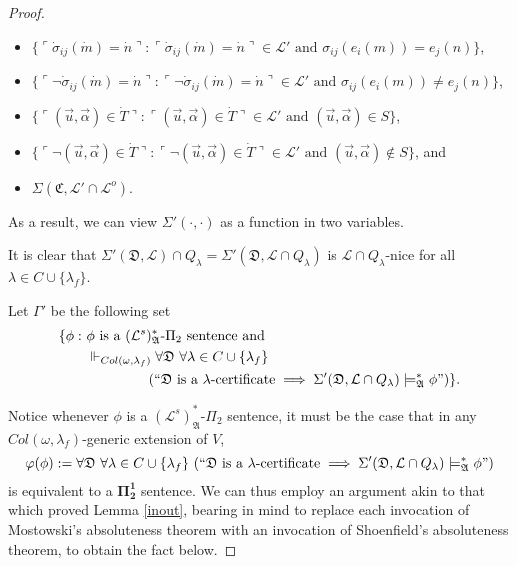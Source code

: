 \documentclass[12pt]{article}
\numberwithin{equation}{section}
\begin{document}
\begin{proof}
\begin{defi}
\begin{itemize}
    \item $\{\ulcorner \dot{\sigma}_{ij}(\dot{m}) = \dot{n} \urcorner : \ulcorner \dot{\sigma}_{ij}(\dot{m}) = \dot{n} \urcorner \in \mathcal{L}' \text{ and } \sigma_{ij}(e_i(m)) = e_j(n)\}$,
    \item $\{\ulcorner \neg \dot{\sigma}_{ij}(\dot{m}) = \dot{n} \urcorner : \ulcorner \neg \dot{\sigma}_{ij}(\dot{m}) = \dot{n} \urcorner \in \mathcal{L}' \text{ and } \sigma_{ij}(e_i(m)) \neq e_j(n)\}$,
    \item $\{\ulcorner (\Vec{u}, \Vec{\alpha}) \in \dot{T} \urcorner : \ulcorner (\Vec{u}, \Vec{\alpha}) \in \dot{T} \urcorner \in \mathcal{L}' \text{ and } (\Vec{u}, \Vec{\alpha}) \in S\}$,
    \item $\{\ulcorner \neg (\Vec{u}, \Vec{\alpha}) \in \dot{T} \urcorner : \ulcorner \neg (\Vec{u}, \Vec{\alpha}) \in \dot{T} \urcorner \in \mathcal{L}' \text{ and } (\Vec{u}, \Vec{\alpha}) \not\in S\}$, and
    \item $\Sigma(\mathfrak{C}, \mathcal{L}' \cap \mathcal{L}^o)$.
\end{itemize}
As a result, we can view $\Sigma'(\cdot, \cdot)$ as a function in two variables.
\end{defi}

It is clear that $\Sigma'(\mathfrak{D}, \mathcal{L}) \cap Q_{\lambda} = \Sigma'(\mathfrak{D}, \mathcal{L} \cap Q_{\lambda})$ is $\mathcal{L} \cap Q_{\lambda}$-nice for all $\lambda \in C \cup \{\lambda_f\}$.

\begin{defi}
Let $\Gamma'$ be the following set
\begin{align*}
    \{\phi : \ & \phi \text{ is a } (\mathcal{L}^s)^*_{\mathfrak{A}}\text{-}\Pi_2 \text{ sentence and} \\
    & \Vdash_{Col(\omega, \lambda_f)} \forall \mathfrak{D} \ \forall \lambda \in C \cup \{\lambda_f\} \\
    & \mspace{80mu} (``\mathfrak{D} \text{ is a } \lambda \text{-certificate} \implies \Sigma'(\mathfrak{D}, \mathcal{L} \cap Q_{\lambda}) \models^*_{\mathfrak{A}} \phi")\} \text{.}
\end{align*}
\end{defi}

Notice whenever $\phi$ is a $(\mathcal{L}^s)^*_{\mathfrak{A}}$-$\Pi_2$ sentence, it must be the case that in any $Col(\omega, \lambda_f)$-generic extension of $V$, 
\begin{equation*}
    \varphi(\phi) := \forall \mathfrak{D} \ \forall \lambda \in C \cup \{\lambda_f\} \ (``\mathfrak{D} \text{ is a } \lambda \text{-certificate} \implies \Sigma'(\mathfrak{D}, \mathcal{L} \cap Q_{\lambda}) \models^*_{\mathfrak{A}} \phi")
\end{equation*}
is equivalent to a $\mathbf{\Pi^1_2}$ sentence. We can thus employ an argument akin to that which proved Lemma \ref{inout}, bearing in mind to replace each invocation of Mostowski's absoluteness theorem with an invocation of Shoenfield's absoluteness theorem, to obtain the fact below.


\end{proof}
\end{document}

